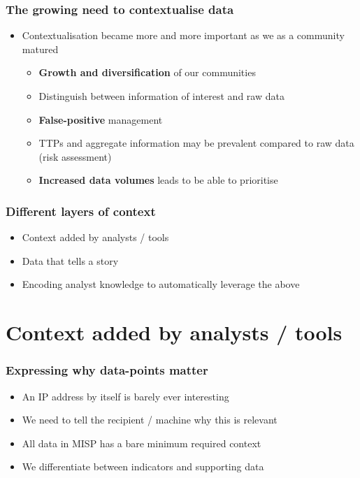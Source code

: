 \begin{frame}
\frametitle{The growing need to contextualise data}
\begin{itemize}
       \item Contextualisation became more and more important as we as a community matured
        \begin{itemize}
                \item {\bf Growth and diversification} of our communities
                \item Distinguish between information of interest and raw data
                \item {\bf False-positive} management
                \item TTPs and aggregate information may be prevalent compared to raw data (risk assessment)
                \item {\bf Increased data volumes} leads to be able to prioritise
        \end{itemize}
\end{itemize}
\end{frame}

\begin{frame}
\frametitle{Different layers of context}
\begin{itemize}
       \item Context added by analysts / tools
       \item Data that tells a story
       \item Encoding analyst knowledge to automatically leverage the above
\end{itemize}
\end{frame}

\section{Context added by analysts / tools}

\begin{frame}
\frametitle{Expressing why data-points matter}
\begin{itemize}
       \item An IP address by itself is barely ever interesting
       \item We need to tell the recipient / machine why this is relevant
       \item All data in MISP has a bare minimum required context
       \item We differentiate between indicators and supporting data
\end{itemize}
\end{frame}

